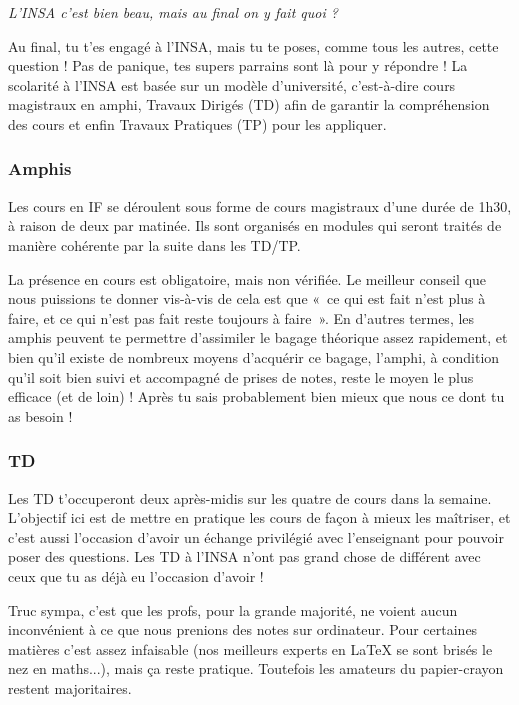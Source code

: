 \vspace{1em}
\begin{citationii}
\emph{L'INSA c'est bien beau, mais au final on y fait quoi ?}
\end{citationii}
Au final, tu t'es engagé à l'INSA, mais tu te poses, comme tous les autres, cette
question !
Pas de panique, tes supers parrains sont là pour y répondre !
La scolarité à l'INSA est basée sur un modèle d'université, c'est-à-dire cours
magistraux en amphi, Travaux Dirigés (TD) afin de garantir la compréhension des
cours et enfin Travaux Pratiques (TP) pour les appliquer.

\subsubsection{Amphis}
Les cours en IF se déroulent sous forme de cours magistraux d'une durée de
1h30, à raison de deux par matinée. Ils sont organisés en modules qui
seront traités de manière cohérente par la suite dans les TD/TP.

\vspace{1em}

La présence en cours est obligatoire, mais non vérifiée. Le meilleur conseil que
nous puissions te donner vis-à-vis de cela est que «~ce qui est fait n'est plus à
faire, et ce qui n'est pas fait reste toujours à faire~». En d'autres termes, les
amphis peuvent te permettre d'assimiler le bagage théorique assez rapidement, et
bien qu'il existe de nombreux moyens d'acquérir ce bagage, l'amphi, à
condition qu'il soit bien suivi et accompagné de prises de notes, reste le moyen le plus 
efficace (et de loin) ! Après tu sais probablement bien mieux que nous ce dont tu as besoin !
\subsubsection{TD}
Les TD t'occuperont deux après-midis sur les quatre de cours dans la semaine.
L'objectif ici est de mettre en pratique les cours de façon à mieux les
maîtriser, et c'est aussi l'occasion d'avoir un échange privilégié avec
l'enseignant pour pouvoir poser des questions. Les TD à l'INSA n'ont pas grand chose
de différent avec ceux que tu as déjà eu l'occasion d'avoir ! 

\vspace{1em}

Truc sympa, c'est que les profs, pour la grande majorité, ne voient aucun
inconvénient à ce que nous prenions des notes sur ordinateur. Pour
certaines matières c'est assez infaisable (nos meilleurs experts en \LaTeX{} se
sont brisés le nez en maths...), mais ça reste pratique. Toutefois les
amateurs du papier-crayon restent majoritaires.
